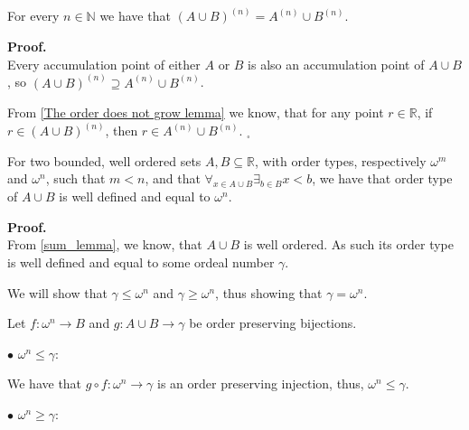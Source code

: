 
\begin{corollary}\label{derivative and sum is commutative}
For every $n\in\mathbb{N}$ we have that $(A\cup B)^{(n)} = A^{(n)}\cup B^{(n)}$.
\end{corollary}
\textbf{Proof.} \\


Every accumulation point of either $A$ or $B$ is also an accumulation point of $A\cup B$, so 
$(A\cup B)^{(n)} \supseteq A^{(n)}\cup B^{(n)}$.

From \ref{The order does not grow lemma} we know, that for any point $r\in \mathbb{R}$, if 
$r \in (A\cup B)^{(n)}$, then $r \in  A^{(n)}\cup B^{(n)}$. $_\square$

\begin{lemma}\label{key_lemma}
For two bounded, well ordered sets $A, B \subseteq \mathbb{R}$, with order types, respectively 
$\omega^m$ 
and $\omega^n$, 
such that $m < n$, and that $\forall_{x\in A\cup B}\exists_{b\in B}x<b$, we have 
that order type of $A \cup B$ is well defined and 
equal to $\omega^n$.
\end{lemma}
\textbf{Proof.} \\
From \ref{sum_lemma}, we know, that $A\cup B$ is well ordered. As such its order type is well 
defined and equal to some ordeal number $\gamma$. 

We will show that $\gamma \leq \omega^n$ and $\gamma \geq \omega^n$, 
thus showing that $\gamma = \omega^n$.

Let $f : \omega^n \to B$ and $g : A \cup B \to \gamma$ be order preserving bijections. 

$\bullet$ $\omega^n \leq \gamma$: 

We have that  
$g\circ f : \omega^n \to \gamma$ 
is an order preserving injection, thus, $\omega^n \leq \gamma$. 

$\bullet$ $\omega^n \geq \gamma$: 

